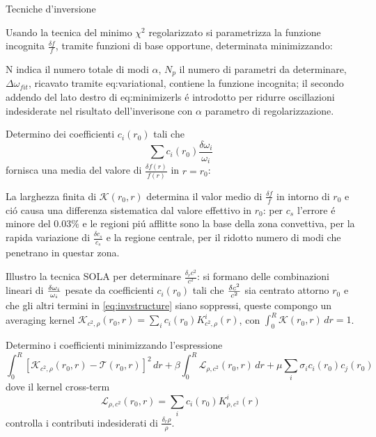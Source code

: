 \documentclass[10pt,xcolor={usenames},fleqn,mathserif,serif]{beamer}
\begin{document}
\begin{wordonframe}{Tecniche d'inversione}

Usando la tecnica del minimo $\chi^2$ regolarizzato si parametrizza la funzione incognita $\frac{\delta f}{f}$, tramite funzioni di base opportune, determinata minimizzando:

N indica il numero totale di modi $\alpha$, $N_p$ il numero di parametri da determinare, $\Delta\omega_{fit}$, ricavato tramite eq:variational, contiene la funzione incognita; il secondo addendo del lato destro di eq:minimizerls \'e introdotto per ridurre oscillazioni indesiderate nel risultato dell'inverisone con $\alpha$ parametro di regolarizzazione.

Determino dei coefficienti $c_i(r_0)$ tali che \[\sum c_i(r_0)\frac{\delta\omega_i}{\omega_i}\] fornisca una media del valore di $\frac{\delta f(r)}{f(r)}$ in $r=r_0$:

La larghezza finita di $\mathcal{K}(r_0,r)$ determina il valor medio di $\frac{\delta f}{f}$ in intorno di $r_0$ e ci\'o causa una differenza sistematica  dal valore effettivo in $r_0$: per $c_s$ l'errore \'e minore del $0.03\%$ e le regioni pi\'u afflitte sono la base della zona convettiva, per la rapida variazione di $\frac{\delta c_s}{c_s}$ e la regione centrale, per il ridotto numero di modi che penetrano in questar zona.

Illustro la tecnica SOLA per determinare $\frac{\delta_rc^2}{c^2}$: si formano delle combinazioni lineari di $\frac{\delta \omega_i}{\omega_i}$ pesate da coefficienti $c_i(r_0)$ tali che $\frac{\delta c^2}{c^2}$ sia centrato attorno $r_0$ e che gli altri termini in \eqref{eq:invstructure} siano soppressi, queste compongo un averaging kernel $\mathcal{K}_{c^2,\rho}(r_0,r)=\sum_ic_i(r_0)K_{c^2,\rho}^i(r)$, con $\int_0^R\mathcal{K}(r_0,r)\,dr=1$.


Determino i coefficienti minimizzando l'espressione
\begin{equation}
\int_0^R[\mathcal{K}_{c^2,\rho}(r_0,r)-\mathcal{T}(r_0,r)]^2\,dr+\beta\int_0^R\mathcal{L}_{\rho,c^2}(r_0,r)\,dr+\mu\sum_i\sigma_ic_i(r_0)c_j(r_0)
\end{equation}
dove il kernel cross-term
\begin{equation}
\mathcal{L}_{\rho,c^2}(r_0,r)=\sum_ic_i(r_0)K_{\rho,c^2}^i(r)
\end{equation}
controlla i contributi indesiderati di $\frac{\delta_r\rho}{\rho}$.

\end{wordonframe}
\end{document}
